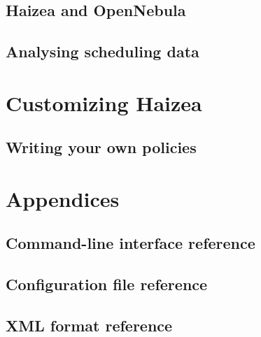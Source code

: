 \documentclass[11pt,oneside]{scrbook}
\begin{document}
\chapter{Haizea and OpenNebula}
\label{chap:opennebula}


\chapter{Analysing scheduling data}
\label{chap:analysing}



\part{Customizing Haizea}

\chapter{Writing your own policies}
\label{chap:policies}










\part{Appendices}
\appendix

\chapter{Command-line interface reference}
\label{app:cli}


\chapter{Configuration file reference}
\label{app:conffile}


\chapter{XML format reference}
\label{app:lwf}

\end{document}
